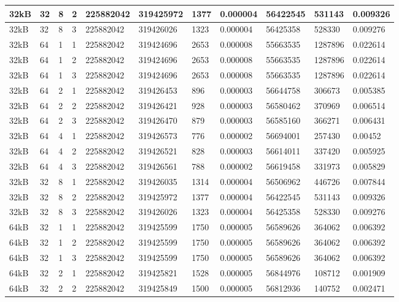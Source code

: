 \documentclass[conference]{IEEEtran}
\begin{document}
\begin{table}
\begin{tabular}{|m{.75cm} |m{.75cm} |m{.8cm} | m{.75cm} | l | l | l | l | l | l | l |}
32kB&	32&	8&	2&	225882042&	319425972&	1377  &	0.000004  &	56422545  &	531143	&0.009326 \\ \hline
32kB&	32&	8&	3&	225882042&	319426026&	1323  &	0.000004  &	56425358  &	528330	&0.009276 \\ \hline
32kB&	64&	1&	1&	225882042&	319424696&	2653  &	0.000008  &	55663535  &	1287896	&0.022614 \\ \hline
32kB&	64&	1&	2&	225882042&	319424696&	2653  &	0.000008  &	55663535  &	1287896	&0.022614 \\ \hline
32kB&	64&	1&	3&	225882042&	319424696&	2653  &	0.000008  &	55663535  &	1287896	&0.022614 \\ \hline
32kB&	64&	2&	1&	225882042&	319426453&	896	  &0.000003	  &56644758	  &306673	  &0.005385 \\ \hline
32kB&	64&	2&	2&	225882042&	319426421&	928	  &0.000003	  &56580462	  &370969	  &0.006514 \\ \hline
32kB&	64&	2&	3&	225882042&	319426470&	879	  &0.000003	  &56585160	  &366271	  &0.006431 \\ \hline
32kB&	64&	4&	1&	225882042&	319426573&	776	  &0.000002	  &56694001	  &257430	  &0.00452 \\ \hline
32kB&	64&	4&	2&	225882042&	319426521&	828	  &0.000003	  &56614011	  &337420	  &0.005925 \\ \hline
32kB&	64&	4&	3&	225882042&	319426561&	788	  &0.000002	  &56619458	  &331973	  &0.005829 \\ \hline
32kB&	32&	8&	1&	225882042&	319426035&	1314  &	0.000004  &	56506962  &	446726	&0.007844 \\ \hline
32kB&	32&	8&	2&	225882042&	319425972&	1377  &	0.000004  &	56422545  &	531143	&0.009326 \\ \hline
32kB&	32&	8&	3&	225882042&	319426026&	1323  &	0.000004  &	56425358  &	528330	&0.009276 \\ \hline
64kB&	32&	1&	1&	225882042&	319425599&	1750  &	0.000005  &	56589626  &	364062	&0.006392 \\ \hline
64kB&	32&	1&	2&	225882042&	319425599&	1750  &	0.000005  &	56589626  &	364062	&0.006392 \\ \hline
64kB&	32&	1&	3&	225882042&	319425599&	1750  &	0.000005  &	56589626  &	364062	&0.006392 \\ \hline
64kB&	32&	2&	1&	225882042&	319425821&	1528  &	0.000005  &	56844976  &	108712	&0.001909 \\ \hline
64kB&	32&	2&	2&	225882042&	319425849&	1500  &	0.000005  &	56812936  &	140752	&0.002471 \\ \hline

\end{tabular}
\end{table}
\end{document}
